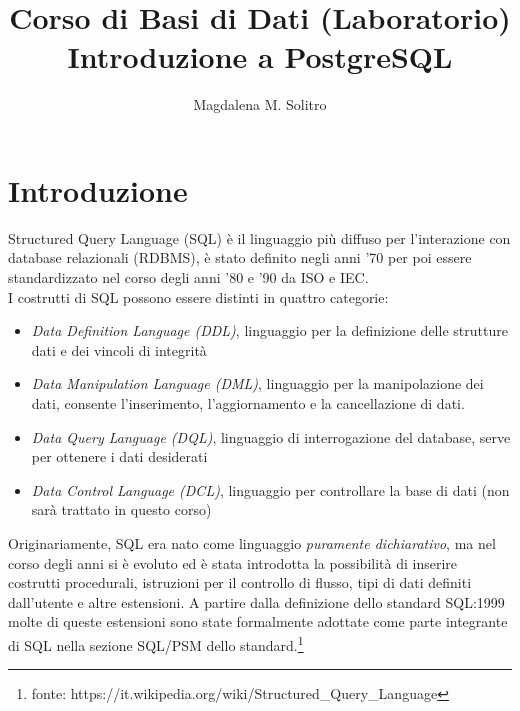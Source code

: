 \documentclass[12pt,a4paper]{book}
\title{Corso di Basi di Dati (Laboratorio)\\
	Introduzione a PostgreSQL}
\author{Magdalena M. Solitro}
\begin{document}
	\frontmatter
	
	\maketitle
	
	\tableofcontents
	
	\mainmatter
	
	\chapter{Introduzione}
	Structured Query Language (SQL) è il linguaggio più diffuso per l'interazione con database relazionali (RDBMS), è stato definito negli anni '70 per poi essere standardizzato nel corso degli anni '80 e '90 da ISO e IEC.\\
	I costrutti di SQL possono essere distinti in quattro categorie:
	\begin{itemize}
		\item \textit{Data Definition Language (DDL)}, linguaggio per la definizione delle strutture dati e dei vincoli di integrità
		\item \textit{Data Manipulation Language (DML)}, linguaggio per la manipolazione dei dati, consente l'inserimento, l'aggiornamento e la cancellazione di dati.
		\item \textit{Data Query Language (DQL)}, linguaggio di interrogazione del database, serve per ottenere i dati desiderati 
		\item \textit{Data Control Language (DCL)}, linguaggio per controllare la base di dati (non sarà trattato in questo corso)
	\end{itemize}
	Originariamente, SQL era nato come linguaggio \textit{puramente dichiarativo},  ma nel corso degli anni si è evoluto ed è stata introdotta la possibilità di inserire costrutti procedurali, istruzioni per il controllo di flusso, tipi di dati definiti dall'utente e altre estensioni. A partire dalla definizione dello standard SQL:1999 molte di queste estensioni sono state formalmente adottate come parte integrante di SQL nella sezione SQL/PSM dello standard.\footnote{fonte: https://it.wikipedia.org/wiki/Structured_Query_Language }
\end{document}
